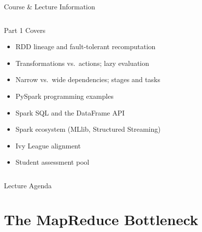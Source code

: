 \documentclass[aspectratio=169,10pt]{beamer}
\begin{document}
\begin{frame}{Course \& Lecture Information}
\begin{columns}[T]
\begin{exampleblock}{Part 1 Covers}
\begin{itemize}
          \item RDD lineage and fault-tolerant recomputation
          \item Transformations vs.\ actions; lazy evaluation
          \item Narrow vs.\ wide dependencies; stages and tasks
          \item PySpark programming examples
          \item Spark SQL and the DataFrame API
          \item Spark ecosystem (MLlib, Structured Streaming)
          \item Ivy League alignment
          \item Student assessment pool
        \end{itemize}
      \end{exampleblock}
  \end{columns}
\end{frame}

\begin{frame}{Lecture Agenda}
  \tableofcontents
\end{frame}

\section{The MapReduce Bottleneck}
\end{document}

